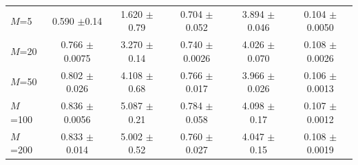 \begin{table}[t]
\begin{tabular}{lccccc}
$M$=5 & 0.590 {\footnotesize $\pm$0.14} & 1.620 {\footnotesize $\pm$0.79} & 0.704 {\footnotesize $\pm$0.052} & 3.894 {\footnotesize $\pm$0.046} & 0.104 {\footnotesize $\pm$0.0050} \\
$M$=20 & 0.766 {\footnotesize $\pm$0.0075} & 3.270 {\footnotesize $\pm$0.14} & 0.740 {\footnotesize $\pm$0.0026} & 4.026 {\footnotesize $\pm$0.070} & 0.108 {\footnotesize $\pm$0.0026} \\
$M$=50 & 0.802 {\footnotesize $\pm$0.026} & 4.108 {\footnotesize $\pm$0.68} & 0.766 {\footnotesize $\pm$0.017} & 3.966 {\footnotesize $\pm$0.026} & 0.106 {\footnotesize $\pm$0.0013} \\
$M$=100 & 0.836 {\footnotesize $\pm$0.0056} & 5.087 {\footnotesize $\pm$0.21} & 0.784 {\footnotesize $\pm$0.058} & 4.098 {\footnotesize $\pm$0.17} & 0.107 {\footnotesize $\pm$0.0012} \\
$M$=200 & 0.833 {\footnotesize $\pm$0.014} & 5.002 {\footnotesize $\pm$0.52} & 0.760 {\footnotesize $\pm$0.027} & 4.047 {\footnotesize $\pm$0.15} & 0.108 {\footnotesize $\pm$0.0019} \\
\bottomrule
\end{tabular}%
\end{table}
